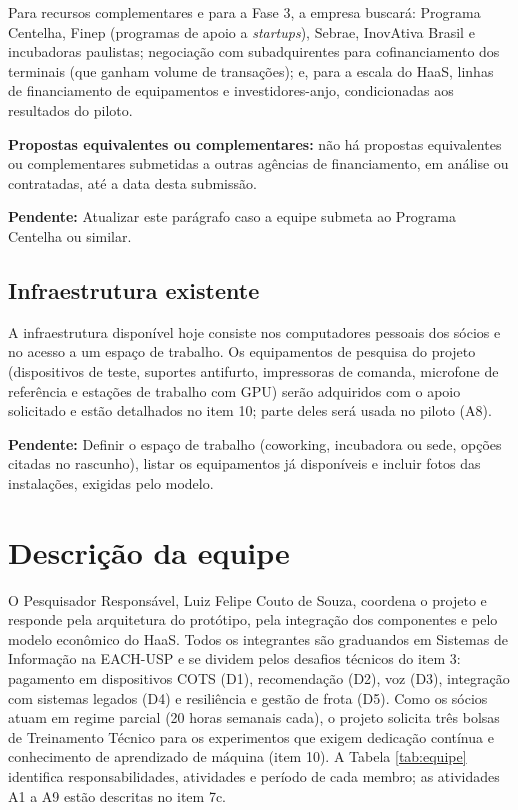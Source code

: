 \documentclass[12pt,a4paper]{article}
\newcommand{\pendente}[1]{\begin{pendbox}\textbf{\color{pendfg}Pendente:} #1\end{pendbox}}
\begin{document}
Para recursos complementares e para a Fase 3, a empresa buscará: Programa Centelha, Finep (programas de apoio a \textit{startups}), Sebrae, InovAtiva Brasil e incubadoras paulistas; negociação com subadquirentes para cofinanciamento dos terminais (que ganham volume de transações); e, para a escala do HaaS, linhas de financiamento de equipamentos e investidores-anjo, condicionadas aos resultados do piloto.

\textbf{Propostas equivalentes ou complementares:} não há propostas equivalentes ou complementares submetidas a outras agências de financiamento, em análise ou contratadas, até a data desta submissão.

\pendente{Atualizar este parágrafo caso a equipe submeta ao Programa Centelha ou similar.}

\subsection{Infraestrutura existente}

A infraestrutura disponível hoje consiste nos computadores pessoais dos sócios e no acesso a um espaço de trabalho. Os equipamentos de pesquisa do projeto (dispositivos de teste, suportes antifurto, impressoras de comanda, microfone de referência e estações de trabalho com GPU) serão adquiridos com o apoio solicitado e estão detalhados no item 10; parte deles será usada no piloto (A8).

\pendente{Definir o espaço de trabalho (coworking, incubadora ou sede, opções citadas no rascunho), listar os equipamentos já disponíveis e incluir fotos das instalações, exigidas pelo modelo.}

\section{Descrição da equipe}

O Pesquisador Responsável, Luiz Felipe Couto de Souza, coordena o projeto e responde pela arquitetura do protótipo, pela integração dos componentes e pelo modelo econômico do HaaS. Todos os integrantes são graduandos em Sistemas de Informação na EACH-USP e se dividem pelos desafios técnicos do item 3: pagamento em dispositivos COTS (D1), recomendação (D2), voz (D3), integração com sistemas legados (D4) e resiliência e gestão de frota (D5). Como os sócios atuam em regime parcial (20 horas semanais cada), o projeto solicita três bolsas de Treinamento Técnico para os experimentos que exigem dedicação contínua e conhecimento de aprendizado de máquina (item 10). A Tabela \ref{tab:equipe} identifica responsabilidades, atividades e período de cada membro; as atividades A1 a A9 estão descritas no item 7c.
\end{document}
